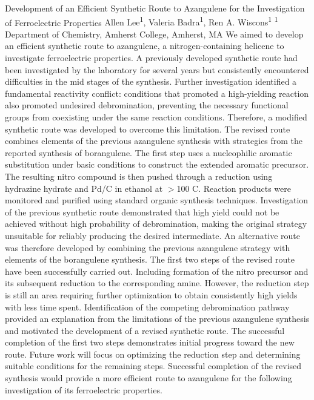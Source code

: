 \makeabstract
    {
    Development of an Efficient Synthetic Route to Azangulene for the Investigation of Ferroelectric Properties
    }
    {
    Allen Lee\textsuperscript{1}, Valeria Badra\textsuperscript{1}, Ren A. Wiscons\textsuperscript{1}
    }
    {
    \textsuperscript{1} Department of Chemistry, Amherst College, Amherst, MA
    }
    {
    We aimed to develop an efficient synthetic route to azangulene, a nitrogen-containing helicene to investigate ferroelectric properties.  A previously developed synthetic route had been investigated by the laboratory for several years but consistently encountered difficulties in the mid stages of the synthesis.  Further investigation identified a fundamental reactivity conflict: conditions that promoted a high-yielding reaction also promoted undesired debromination, preventing the necessary functional groups from coexisting under the same reaction conditions.  Therefore, a modified synthetic route was developed to overcome this limitation.
    }
    {
    The revised route combines elements of the previous azangulene synthesis with strategies from the reported synthesis of borangulene.  The first step uses a nucleophilic aromatic substitution under basic conditions to construct the extended aromatic precursor.  The resulting nitro compound is then pushed through a reduction using hydrazine hydrate and Pd/C in ethanol at \ensuremath{>}100 {\textdegree}C.  Reaction products were monitored and purified using standard organic synthesis techniques.  
    }
    {
    Investigation of the previous synthetic route demonstrated that high yield could not be achieved without high probability of debromination, making the original strategy unsuitable for reliably producing the desired intermediate.  An alternative route was therefore developed by combining the previous azangulene strategy with elements of the borangulene synthesis.  The first two steps of the revised route have been successfully carried out.  Including formation of the nitro precursor and its subsequent reduction to the corresponding amine.  However, the reduction step is still an area requiring further optimization to obtain consistently high yields with less time spent.  
    }
    {
    Identification of the competing debromination pathway provided an explanation from the limitations of the previous azangulene synthesis and motivated the development of a revised synthetic route.  The successful completion of the first two steps demonstrates initial progress toward the new route.  Future work will focus on optimizing the reduction step and determining suitable conditions for the remaining steps.  Successful completion of the revised synthesis would provide a more efficient route to azangulene for the following investigation of its ferroelectric properties.  
    }

    \newpage
    